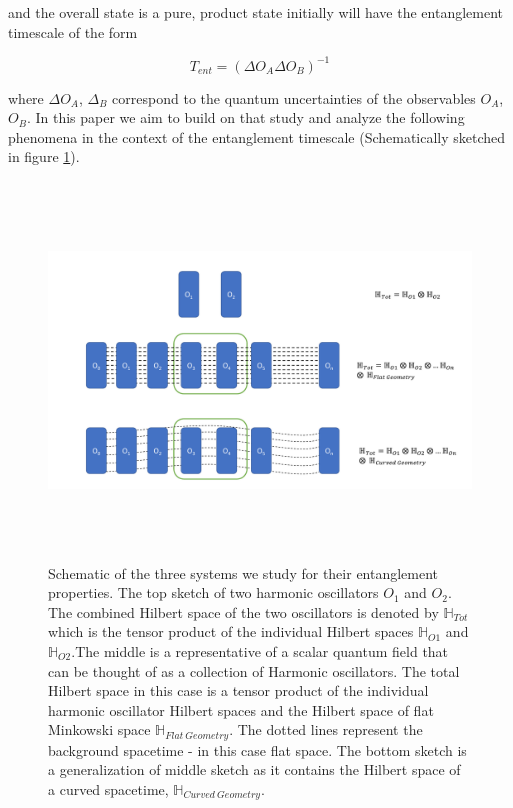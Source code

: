 \documentclass[aps,showpacs,onecolumn,floats,prd,superscriptaddress,nofootinbib]{revtex4-1}
\begin{document}
and the overall state is a pure, product state initially will have the entanglement timescale of the form

\begin{equation}
	T_{ent} = \left( \Delta O_A \Delta O_B \right)^{-1}
\end{equation}

where $\Delta O_A$, $\Delta_B$ correspond to the quantum uncertainties of the observables $O_A$, $O_B$. 
In this paper we aim to build on that study and analyze the following phenomena in the context of the entanglement timescale (Schematically sketched in figure \ref{osc}). 

\begin{figure}[h!]
\begin{center}
\includegraphics[width=\textwidth,height=10cm]{Schematic_oscillators.pdf}
\caption{Schematic of the three systems we study for their entanglement properties. The top sketch of two harmonic oscillators $O_1$ and $O_2$. The combined Hilbert space of the two oscillators is denoted by $\mathbb{H}_{Tot}$ which is the tensor product of the individual Hilbert spaces $\mathbb{H}_{O1}$ and $\mathbb{H}_{O2}$.The middle is a representative of a scalar quantum field that can be thought of as a collection of Harmonic oscillators. The total Hilbert space in this case is a tensor product of the individual harmonic oscillator Hilbert spaces and the Hilbert space of flat Minkowski space $\mathbb{H}_{Flat \ Geometry}$. The dotted lines represent the background spacetime - in this case flat space. The bottom sketch is a generalization of middle sketch as it contains the Hilbert space of a curved spacetime, $\mathbb{H}_{Curved \ Geometry}$.}
\label{osc}
\end{center}
\end{figure}
\end{document}
